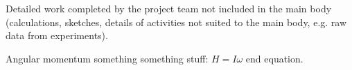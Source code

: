 \color{red}
Detailed work completed by the project team not included in the main body (calculations, sketches, details of activities not suited to the main body, e.g. raw data from experiments).
\color{black}

Angular momentum something something stuff:
$H = I\omega$
end equation.